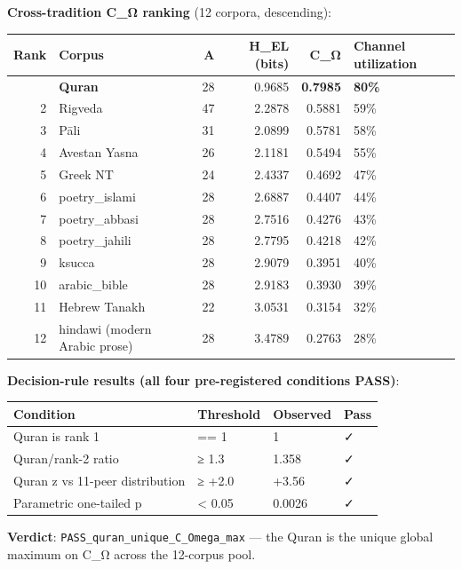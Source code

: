 \documentclass[
]{article}
\newcounter{none} %
\begin{document}
\textbf{Cross-tradition C\_Ω ranking} (12 corpora, descending):

{\def\LTcaptype{none} %
\begin{longtable}[]{@{}rlrrrl@{}}
\toprule\noalign{}
Rank & Corpus & A & H\_EL (bits) & \textbf{C\_Ω} & Channel
utilization \\
\midrule\noalign{}
\endhead
\bottomrule\noalign{}
\endlastfoot
1 & \textbf{Quran} & 28 & 0.9685 & \textbf{0.7985} & \textbf{80\%} \\
2 & Rigveda & 47 & 2.2878 & 0.5881 & 59\% \\
3 & Pāli & 31 & 2.0899 & 0.5781 & 58\% \\
4 & Avestan Yasna & 26 & 2.1181 & 0.5494 & 55\% \\
5 & Greek NT & 24 & 2.4337 & 0.4692 & 47\% \\
6 & poetry\_islami & 28 & 2.6887 & 0.4407 & 44\% \\
7 & poetry\_abbasi & 28 & 2.7516 & 0.4276 & 43\% \\
8 & poetry\_jahili & 28 & 2.7795 & 0.4218 & 42\% \\
9 & ksucca & 28 & 2.9079 & 0.3951 & 40\% \\
10 & arabic\_bible & 28 & 2.9183 & 0.3930 & 39\% \\
11 & Hebrew Tanakh & 22 & 3.0531 & 0.3154 & 32\% \\
12 & hindawi (modern Arabic prose) & 28 & 3.4789 & 0.2763 & 28\% \\
\end{longtable}
}

\textbf{Decision-rule results (all four pre-registered conditions
PASS)}:

{\def\LTcaptype{none} %
\begin{longtable}[]{@{}llll@{}}
\toprule\noalign{}
Condition & Threshold & Observed & Pass \\
\midrule\noalign{}
\endhead
\bottomrule\noalign{}
\endlastfoot
Quran is rank 1 & == 1 & 1 & ✓ \\
Quran/rank-2 ratio & ≥ 1.3 & 1.358 & ✓ \\
Quran z vs 11-peer distribution & ≥ +2.0 & +3.56 & ✓ \\
Parametric one-tailed p & \textless{} 0.05 & 0.0026 & ✓ \\
\end{longtable}
}

\textbf{Verdict}: \texttt{PASS\_quran\_unique\_C\_Omega\_max} --- the
Quran is the unique global maximum on C\_Ω across the 12-corpus pool.
\end{document}

